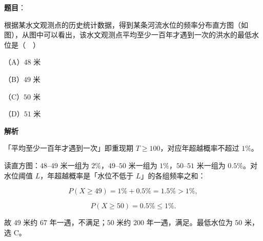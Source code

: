 \begin{answer}

\textbf{题目}：

根据某水文观测点的历史统计数据，得到某条河流水位的频率分布直方图（如图），从图中可以看出，该水文观测点平均至少一百年才遇到一次的洪水的最低水位是（　）
\nopagebreak[4]
\begin{center}\end{center}
\nopagebreak[4]
（A）$48$ 米

（B）$49$ 米

（C）$50$ 米

（D）$51$ 米

\textbf{解析}

「平均至少一百年才遇到一次」即重现期 $T\geqslant100$，对应年超越概率不超过 $1\%$。

读直方图：$48$–$49$ 米一组为 $2\%$，$49$–$50$ 米一组为 $1\%$，$50$–$51$ 米一组为 $0.5\%$。对水位阈值 $L$，年超越概率是「水位不低于 $L$」的各组频率之和：

\nopagebreak[4]
\[P(X\geqslant49)=1\%+0.5\%=1.5\%>1\%,\]

\nopagebreak[4]
\[P(X\geqslant50)=0.5\%\leqslant1\% .\]

故 $49$ 米约 $67$ 年一遇，不满足；$50$ 米约 $200$ 年一遇，满足。最低水位为 $50$ 米，选 C。


\end{answer}
